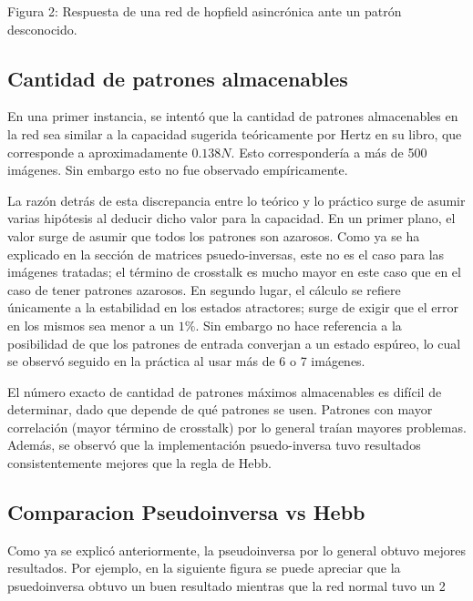 \documentclass[%
    final,
    reprint,
    notitlepage,
    narroweqnarray,
    inline,
    twoside,
    invited
    ]{ieee}
\begin{document}
\begin{center}
\par Figura 2: Respuesta de una red de hopfield asincrónica ante un patrón desconocido.
\end{center}


\subsection{Cantidad de patrones almacenables}

\par En una primer instancia, se intentó que la cantidad de patrones almacenables en la red 
sea similar a la capacidad sugerida teóricamente por Hertz en su libro, que corresponde a aproximadamente 
$0.138N$. Esto correspondería a más de 500 imágenes. Sin embargo esto no fue observado empíricamente.

\par La razón detrás de esta discrepancia entre lo teórico y lo práctico surge de asumir varias hipótesis 
al deducir dicho valor para la capacidad. En un primer plano, el valor surge de asumir que todos 
los patrones son azarosos. Como ya se ha explicado en la sección de matrices psuedo-inversas, este no 
es el caso para las imágenes tratadas; el término de crosstalk es mucho mayor en 
este caso que en el caso de tener patrones azarosos. En segundo lugar, el cálculo se refiere únicamente 
a la estabilidad en los estados atractores; surge de exigir que el error en los mismos sea menor a 
un $1\%$. Sin embargo no hace referencia a la posibilidad de que los patrones de entrada 
converjan a un estado espúreo, lo cual se observó seguido en la práctica al usar más de 6 o 7 imágenes.

\par El número exacto de cantidad de patrones máximos almacenables es difícil de determinar, dado que 
depende de qué patrones se usen. Patrones con mayor correlación (mayor término de crosstalk) por lo 
general traían mayores problemas. Además, se observó que la implementación psuedo-inversa tuvo resultados 
consistentemente mejores que la regla de Hebb.

\subsection{Comparacion Pseudoinversa vs Hebb}

Como ya se explicó anteriormente, la pseudoinversa por lo general obtuvo mejores resultados. Por ejemplo, en la siguiente figura 
se puede apreciar que la psuedoinversa obtuvo un buen resultado mientras que la red normal tuvo un 2%
\end{document}

